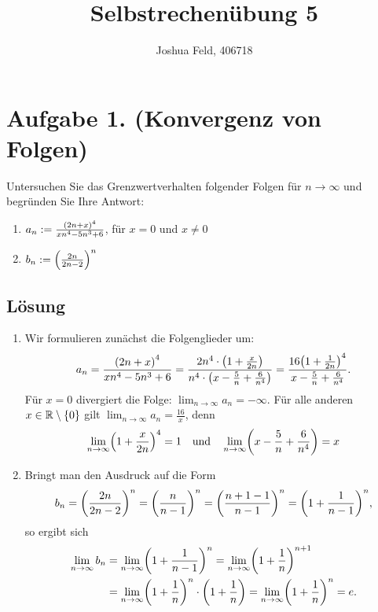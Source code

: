 \documentclass[german,12pt]{homework}
\title{Selbstrechenübung 5}
\author{Joshua Feld, 406718}
\institute{RWTH Aachen University\\Center for Computational Engineering Science}
\newcommand{\RR}{\mathbb{R}}
\DeclarePairedDelimiter{\enbrace}{(}{)}
\DeclarePairedDelimiter{\penbrace}{\{}{\}}
\begin{document}
    \maketitle

    \section*{Aufgabe 1. (Konvergenz von Folgen)}

    \begin{problem}
        Untersuchen Sie das Grenzwertverhalten folgender Folgen für \(n \to \infty\) und begründen Sie Ihre Antwort:
        \begin{enumerate}
            \item \(a_n := \frac{\enbrace*{2n + x}^4}{xn^4 - 5n^3 + 6}\), für \(x = 0\) und \(x \ne 0\)
            \item \(b_n := \enbrace*{\frac{2n}{2n - 2}}^n\)
        \end{enumerate}
    \end{problem}

    \subsection*{Lösung}
    \begin{enumerate}
        \item Wir formulieren zunächst die Folgenglieder um:
        \[a_n = \frac{\enbrace*{2n + x}^4}{xn^4 - 5n^3 + 6} = \frac{2n^4 \cdot \enbrace*{1 + \frac{x}{2n}}}{n^4 \cdot \enbrace*{x - \frac{5}{n} + \frac{6}{n^4}}} = \frac{16\enbrace*{1 + \frac{1}{2n}}^4}{x - \frac{5}{n} + \frac{6}{n^4}}.\]
        Für \(x = 0\) divergiert die Folge:
        \(\lim_{n \to \infty}a_n = -\infty.\)
        Für alle anderen \(x \in \RR \setminus \penbrace*{0}\) gilt \(\lim_{n \to \infty}a_n = \frac{16}{x}\), denn
        \[\lim_{n \to \infty}\enbrace*{1 + \frac{x}{2n}}^4 = 1 \quad \text{und} \quad \lim_{n \to \infty}\enbrace*{x - \frac{5}{n} + \frac{6}{n^4}} = x\]
        \item Bringt man den Ausdruck auf die Form
        \[b_n = \enbrace*{\frac{2n}{2n - 2}}^n = \enbrace*{\frac{n}{n - 1}}^n = \enbrace*{\frac{n + 1 - 1}{n - 1}}^n = \enbrace*{1 + \frac{1}{n - 1}}^n,\]
        so ergibt sich
        \begin{align*}
            \lim_{n \to \infty}b_n &= \lim_{n \to \infty}\enbrace*{1 + \frac{1}{n - 1}}^n = \lim_{n \to \infty}\enbrace*{1 + \frac{1}{n}}^{n + 1}\\
            &= \lim_{n \to \infty}\enbrace*{1 + \frac{1}{n}}^n \cdot \enbrace*{1 + \frac{1}{n}} = \lim_{n \to \infty}\enbrace*{1 + \frac{1}{n}}^n = e.
        \end{align*}
    \end{enumerate}
\end{document}
